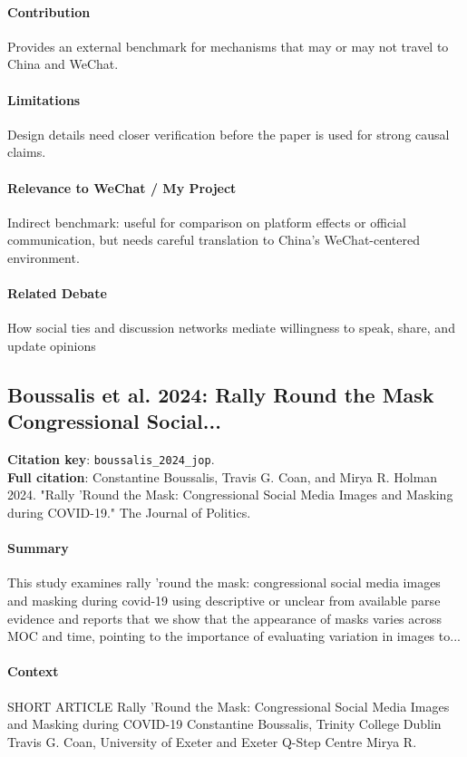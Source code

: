 \documentclass[12pt]{article}
\begin{document}
\paragraph{Contribution} Provides an external benchmark for mechanisms that may or may not travel to China and WeChat.

\paragraph{Limitations} Design details need closer verification before the paper is used for strong causal claims.

\paragraph{Relevance to WeChat / My Project} Indirect benchmark: useful for comparison on platform effects or official communication, but needs careful translation to China's WeChat-centered environment.

\paragraph{Related Debate} How social ties and discussion networks mediate willingness to speak, share, and update opinions


\subsection{Boussalis et al. 2024: Rally Round the Mask Congressional Social...}
\textbf{Citation key}: \texttt{boussalis\_2024\_jop}.\\
\textbf{Full citation}: Constantine Boussalis, Travis G. Coan, and Mirya R. Holman 2024. "Rally 'Round the Mask: Congressional Social Media Images and Masking during COVID-19." The Journal of Politics.

\paragraph{Summary} This study examines rally 'round the mask: congressional social media images and masking during covid-19 using descriptive or unclear from available parse evidence and reports that we show that the appearance of masks varies across MOC and time, pointing to the importance of evaluating variation in images to...

\paragraph{Context} SHORT ARTICLE Rally 'Round the Mask: Congressional Social Media Images and Masking during COVID-19 Constantine Boussalis, Trinity College Dublin Travis G. Coan, University of Exeter and Exeter Q-Step Centre Mirya R.
\end{document}
